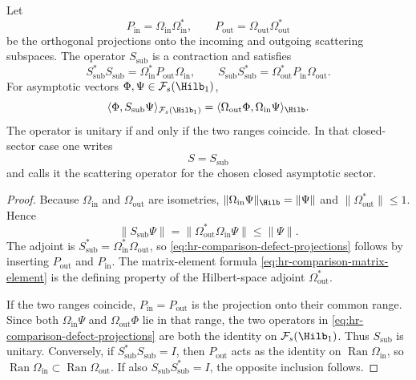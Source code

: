 \begin{proposition}
\label{prop:hr-comparison-contraction-range-defects}
Let
\[
  P_{\mathrm{in}}=\Omega_{\mathrm{in}}\Omega_{\mathrm{in}}^*,
  \qquad
  P_{\mathrm{out}}=\Omega_{\mathrm{out}}\Omega_{\mathrm{out}}^*
\]
be the orthogonal projections onto the incoming and outgoing scattering
subspaces.  The operator \(S_{\mathrm{sub}}\) is a contraction and satisfies
\begin{equation}
  S_{\mathrm{sub}}^*S_{\mathrm{sub}}
  =
  \Omega_{\mathrm{in}}^*P_{\mathrm{out}}\Omega_{\mathrm{in}},
  \qquad
  S_{\mathrm{sub}}S_{\mathrm{sub}}^*
  =
  \Omega_{\mathrm{out}}^*P_{\mathrm{in}}\Omega_{\mathrm{out}} .
  \label{eq:hr-comparison-defect-projections}
\end{equation}
For asymptotic vectors \(\Phi,\Psi\in\mathcal F_s(\Hilb_1)\),
\begin{equation}
  \langle\Phi,S_{\mathrm{sub}}\Psi\rangle_{\mathcal F_s(\Hilb_1)}
  =
  \langle\Omega_{\mathrm{out}}\Phi,
  \Omega_{\mathrm{in}}\Psi\rangle_{\Hilb}.
  \label{eq:hr-comparison-matrix-element}
\end{equation}
The operator is unitary if and only if the two ranges coincide.  In that
closed-sector case one writes
\[
  S=S_{\mathrm{sub}}
\]
and calls it the scattering operator for the chosen closed asymptotic sector.
\end{proposition}

\begin{proof}
Because \(\Omega_{\mathrm{in}}\) and \(\Omega_{\mathrm{out}}\) are isometries,
\(\|\Omega_{\mathrm{in}}\Psi\|_{\Hilb}=\|\Psi\|\) and
\(\|\Omega_{\mathrm{out}}^*\|\le1\).  Hence
\[
  \|S_{\mathrm{sub}}\Psi\|
  =
  \|\Omega_{\mathrm{out}}^*\Omega_{\mathrm{in}}\Psi\|
  \le
  \|\Psi\| .
\]
The adjoint is
\(S_{\mathrm{sub}}^*=\Omega_{\mathrm{in}}^*\Omega_{\mathrm{out}}\), so
\eqref{eq:hr-comparison-defect-projections} follows by inserting
\(P_{\mathrm{out}}\) and \(P_{\mathrm{in}}\).  The matrix-element formula
\eqref{eq:hr-comparison-matrix-element} is the defining property of the
Hilbert-space adjoint \(\Omega_{\mathrm{out}}^*\).

If the two ranges coincide, \(P_{\mathrm{in}}=P_{\mathrm{out}}\) is the
projection onto their common range.  Since both \(\Omega_{\mathrm{in}}\Psi\) and
\(\Omega_{\mathrm{out}}\Phi\) lie in that range, the two operators in
\eqref{eq:hr-comparison-defect-projections} are both the identity on
\(\mathcal F_s(\Hilb_1)\).  Thus \(S_{\mathrm{sub}}\) is unitary.  Conversely,
if \(S_{\mathrm{sub}}^*S_{\mathrm{sub}}=I\), then
\(P_{\mathrm{out}}\) acts as the identity on
\(\operatorname{Ran}\Omega_{\mathrm{in}}\), so
\(\operatorname{Ran}\Omega_{\mathrm{in}}\subset
\operatorname{Ran}\Omega_{\mathrm{out}}\).  If also
\(S_{\mathrm{sub}}S_{\mathrm{sub}}^*=I\), the opposite inclusion follows.
\end{proof}


